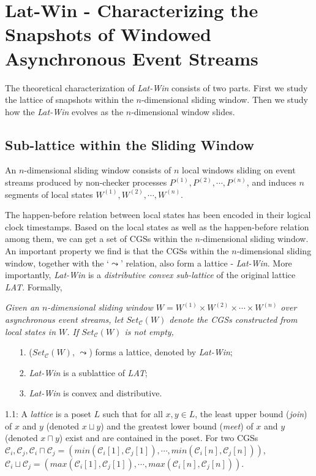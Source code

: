 \documentclass[12pt,journal,letterpaper,compsoc]{IEEEtran}
\begin{document}
\section{Lat-Win - Characterizing the Snapshots of Windowed Asynchronous Event Streams}
\label{sec:characterization}

The theoretical characterization of {\it Lat-Win} consists of two parts. First we study the lattice of snapshots within the $n$-dimensional sliding window. Then we study how the {\it Lat-Win} evolves as the $n$-dimensional window slides.

\subsection{Sub-lattice within the Sliding Window}

An $n$-dimensional sliding window consists of $n$ local windows sliding on event streams produced by non-checker processes $P^{(1)}, P^{(2)}, \cdots, P^{(n)}$, and induces $n$ segments of local states $W^{(1)}, W^{(2)}, \cdots , W^{(n)}$.

The happen-before relation between local states has been encoded in their logical clock timestamps. Based on the local states as well as the happen-before relation among them, we can get a set of CGSs within the $n$-dimensional sliding window. An important property we find is that the CGSs within the $n$-dimensional sliding window, together with the `$\leadsto$' relation, also form a lattice - {\it Lat-Win}. More importantly, {\it Lat-Win} is a {\it distributive convex sub-lattice} of the original lattice {\it LAT}. Formally,\\

 {\it Given an $n$-dimensional sliding window $W = W^{(1)} \times W^{(2)} \times \cdots \times W^{(n)}$ over asynchronous event streams, let $Set_{\mathcal{C}}(W)$ denote the CGSs constructed from local states in $W$. If $Set_{\mathcal{C}}(W)$ is not empty,
\begin{itemize}
    \item[1.] ($Set_{\mathcal{C}}(W)$, $\leadsto$) forms a lattice, denoted by {\it Lat-Win};
    \item[2.] {\it Lat-Win} is a sublattice of {\it LAT};
    \item[3.] {\it Lat-Win} is convex and distributive.
\end{itemize}}


1.1: A {\it lattice} is a poset $L$ such that for all $x, y \in L$, the least upper bound ({\it join}) of $x$ and $y$ (denoted $x \sqcup y$) and the greatest lower bound ({\it meet}) of $x$ and $y$ (denoted $x \sqcap y$) exist and are contained in the poset. For two CGSs $\mathcal{C}_i, \mathcal{C}_j, \mathcal{C}_i \sqcap \mathcal{C}_j = (min(\mathcal{C}_i[1], \mathcal{C}_j[1]), \cdots, min(\mathcal{C}_i[n], \mathcal{C}_j[n]))$, $\mathcal{C}_i \sqcup \mathcal{C}_j = (max(\mathcal{C}_i[1], \mathcal{C}_j[1]), \cdots, max(\mathcal{C}_i[n], \mathcal{C}_j[n]))$.
\end{document}
